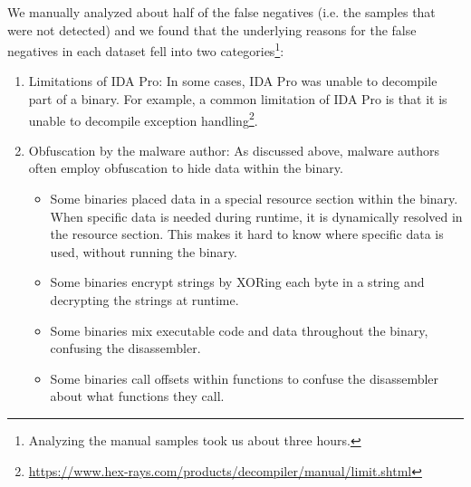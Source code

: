 We manually analyzed about half of the false negatives (i.e. the samples that were not detected) and we found that the underlying reasons for the false negatives in each dataset fell into two categories\footnote{Analyzing the manual samples took us about three hours.}:
\begin{enumerate}
    \item Limitations of IDA Pro: In some cases, IDA Pro was unable to decompile part of a binary. For example, a common limitation of IDA Pro is that it is unable to decompile exception handling\footnote{\tiny \url{https://www.hex-rays.com/products/decompiler/manual/limit.shtml}}.

    \item Obfuscation by the malware author: As discussed above, malware authors often employ obfuscation to hide data within the binary.
    \begin{itemize}
        \item Some binaries placed data in a special resource section within the binary. When specific data is needed during runtime, it is dynamically resolved in the resource section. This makes it hard to know where specific data is used, without running the binary.

        \item Some binaries encrypt strings by XORing each byte in a string and decrypting the strings at runtime.

        \item Some binaries mix executable code and data throughout the binary, confusing the disassembler.

        \item Some binaries call offsets within functions to confuse the disassembler about what functions they call.
    \end{itemize}
\end{enumerate}
